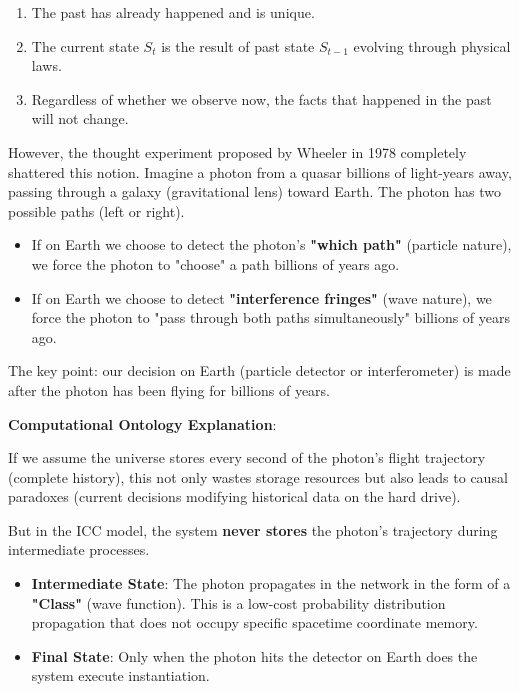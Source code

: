 \begin{enumerate}
\item The past has already happened and is unique.

\item The current state $S_t$ is the result of past state $S_{t-1}$ evolving through physical laws.

\item Regardless of whether we observe now, the facts that happened in the past will not change.
\end{enumerate}

However, the thought experiment proposed by Wheeler in 1978 completely shattered this notion. Imagine a photon from a quasar billions of light-years away, passing through a galaxy (gravitational lens) toward Earth. The photon has two possible paths (left or right).

\begin{itemize}
\item If on Earth we choose to detect the photon's \textbf{"which path"} (particle nature), we force the photon to "choose" a path billions of years ago.

\item If on Earth we choose to detect \textbf{"interference fringes"} (wave nature), we force the photon to "pass through both paths simultaneously" billions of years ago.
\end{itemize}

The key point: our decision on Earth (particle detector or interferometer) is made after the photon has been flying for billions of years.

\textbf{Computational Ontology Explanation}:

If we assume the universe stores every second of the photon's flight trajectory (complete history), this not only wastes storage resources but also leads to causal paradoxes (current decisions modifying historical data on the hard drive).

But in the ICC model, the system \textbf{never stores} the photon's trajectory during intermediate processes.

\begin{itemize}
\item \textbf{Intermediate State}: The photon propagates in the network in the form of a \textbf{"Class"} (wave function). This is a low-cost probability distribution propagation that does not occupy specific spacetime coordinate memory.

\item \textbf{Final State}: Only when the photon hits the detector on Earth does the system execute instantiation.
\end{itemize}

